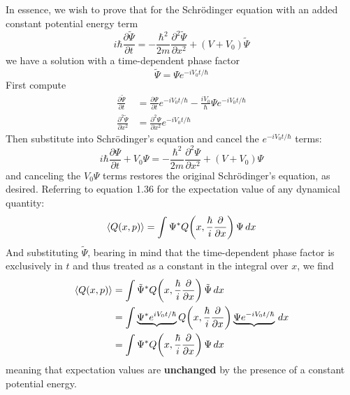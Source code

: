 \documentclass[a4paper]{article}
\begin{document}
In essence, we wish to prove that for the Schr\"odinger equation with an added constant potential energy term
\[
	i \hbar \frac{\partial \tilde{\Psi}}{\partial t} = -\frac{\hbar^{2}}{2m}\frac{\partial^2 \tilde{\Psi}}{\partial x^2} + \!\left( V + V_{0} \right)\tilde{\Psi} 
\]
we have a solution with a time-dependent phase factor
\[
	\tilde{\Psi} = \Psi e^{-iV_{0}t / \hbar} 
\]
First compute
\begin{align*}
	\frac{\partial \tilde{\Psi}}{\partial t} & = \frac{\partial \Psi}{\partial t}e^{-iV_{0}t / \hbar} - \frac{iV_{0}}{\hbar}\Psi e^{-iV_{0}t / \hbar} \\
	\frac{\partial^2 \tilde{\Psi}}{\partial x^2} & = \frac{\partial^2 \Psi}{\partial x^2}e^{-iV_{0}t / \hbar}
\end{align*}
Then substitute into Schr\"odinger's equation and cancel the \( e^{-iV_{0}t / \hbar} \) terms:
\[
	i \hbar \frac{\partial \Psi}{\partial t} + V_{0}\Psi = -\frac{\hbar^{2}}{2m}\frac{\partial^2 \Psi}{\partial x^2} + \!\left( V + V_{0} \right)\Psi 
\]
and canceling the \( V_{0}\Psi \) terms restores the original Schr\"odinger's equation, as desired. Referring to equation 1.36 for the expectation value of any dynamical quantity:
\[
	\braket{Q \!\left( x,p \right)} = \int \Psi^{*}Q \!\left( x,\frac{\hbar}{i}\frac{\partial }{\partial x} \right)\Psi \, dx 
\]
And substituting \( \tilde{\Psi} \), bearing in mind that the time-dependent phase factor is exclusively in \( t \) and thus treated as a constant in the integral over \( x \), we find
\begin{align*}
	\braket{Q \!\left( x,p \right)} & = \int \tilde{\Psi}^{*}Q \!\left( x,\frac{\hbar}{i}\frac{\partial }{\partial x} \right)\tilde{\Psi} \, dx \\
					& = \int \underbrace{\Psi^{*}e^{iV_{0}t / \hbar}}Q \!\left( x,\frac{\hbar}{i}\frac{\partial }{\partial x} \right)\underbrace{\Psi e^{-iV_{0}t / \hbar}} \, dx \\
					& = \int \Psi^{*}Q \!\left( x,\frac{\hbar}{i}\frac{\partial }{\partial x} \right)\Psi \, dx
\end{align*}
meaning that expectation values are \textbf{unchanged} by the presence of a constant potential energy.

\newpage
\end{document}
